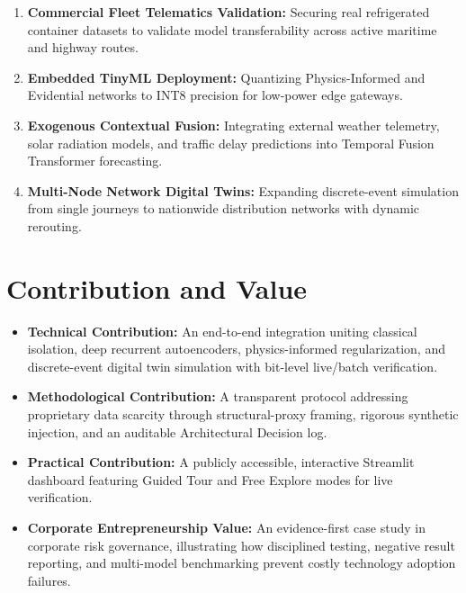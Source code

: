 \documentclass[11pt,a4paper,oneside]{report}
\begin{document}
\begin{enumerate}[leftmargin=*,itemsep=4pt]
    \item \textbf{Commercial Fleet Telematics Validation:} Securing real refrigerated container datasets to validate model transferability across active maritime and highway routes.
    \item \textbf{Embedded TinyML Deployment:} Quantizing Physics-Informed and Evidential networks to INT8 precision for low-power edge gateways.
    \item \textbf{Exogenous Contextual Fusion:} Integrating external weather telemetry, solar radiation models, and traffic delay predictions into Temporal Fusion Transformer forecasting.
    \item \textbf{Multi-Node Network Digital Twins:} Expanding discrete-event simulation from single journeys to nationwide distribution networks with dynamic rerouting.
\end{enumerate}

\chapter{Contribution and Value}
\label{chap:contribution}

\begin{itemize}[leftmargin=*,itemsep=5pt]
    \item \textbf{Technical Contribution:} An end-to-end integration uniting classical isolation, deep recurrent autoencoders, physics-informed regularization, and discrete-event digital twin simulation with bit-level live/batch verification.
    \item \textbf{Methodological Contribution:} A transparent protocol addressing proprietary data scarcity through structural-proxy framing, rigorous synthetic injection, and an auditable Architectural Decision log.
    \item \textbf{Practical Contribution:} A publicly accessible, interactive Streamlit dashboard featuring Guided Tour and Free Explore modes for live verification.
    \item \textbf{Corporate Entrepreneurship Value:} An evidence-first case study in corporate risk governance, illustrating how disciplined testing, negative result reporting, and multi-model benchmarking prevent costly technology adoption failures.
\end{itemize}

\clearpage
\printbibliography[heading=bibintoc,title={References}]
\end{document}
